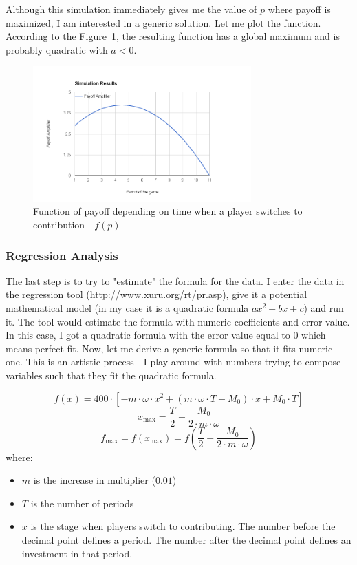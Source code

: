 			Although this simulation immediately gives me the value of $p$ where payoff is maximized, I am interested in a generic solution. Let me plot the function. According to the Figure~\ref{fig:function}, the resulting function has a global maximum and is probably quadratic with $a < 0$.

			\begin{figure}
				\begin{center}
					\includegraphics[width=8.4cm]{resources/function.png}
					\caption{Function of payoff depending on time when a player switches to contribution - $f(p)$} 
					\label{fig:function}
				\end{center}
			\end{figure}			 
		
		\subsubsection{Regression Analysis}
		
			The last step is to try to "estimate" the formula for the data. I enter the data in the regression tool (\url{http://www.xuru.org/rt/pr.asp}), give it a potential mathematical model (in my case it is a quadratic formula $ax^2 + bx + c$) and run it. The tool would estimate the formula with numeric coefficients and error value. In this case, I got a quadratic formula with the error value equal to $0$ which means perfect fit. Now, let me derive a generic formula so that it fits numeric one. This is an artistic process - I play around with numbers trying to compose variables such that they fit the quadratic formula.
			
			\[
				f(x) = 400 \cdot \left[ - m \cdot \omega \cdot x^2 + (m \cdot \omega \cdot T - M_0) \cdot x + M_0 \cdot T \right]
			\]
			\[
				x_\text{max} = \frac{T}{2} - \frac{M_0}{2 \cdot m \cdot \omega}
			\]
			\[
				f_\text{max} = f(x_\text{max}) = f \left(\frac{T}{2} - \frac{M_0}{2 \cdot m \cdot \omega} \right)
			\]
			where:
			\begin{itemize}
				\item
					$m$ is the increase in multiplier ($0.01$)
				\item
					$T$ is the number of periods
				\item
					$x$ is the stage when players switch to contributing. The number before the decimal point defines a period. The number after the decimal point defines an investment in that period.
			\end{itemize}
			
